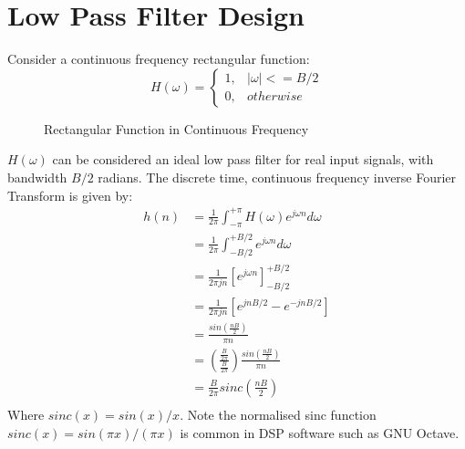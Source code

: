 \documentclass{article}
\begin{document}
\section {Low Pass Filter Design}

Consider a continuous frequency rectangular function:
\begin{equation} \label{eq:h_omega}
H(\omega)= 
	\begin{cases}
      1, & |\omega| <= B/2 \\
      0, & otherwise
	\end{cases}
\end{equation}

\begin{figure}[h]
\caption{Rectangular Function in Continuous Frequency}
\vspace{5mm}
\label{fig:rect_freq}
\centering
{}
\end{figure}

$H(\omega)$ can be considered an ideal low pass filter for real input signals, with bandwidth $B/2$ radians. The discrete time, continuous frequency inverse Fourier Transform is given by:
\begin{equation} \label{eq:dtcf_1}
\begin{split}
h(n) &= \frac{1}{2 \pi} \int_{-\pi}^{+\pi} H(\omega )e^{j \omega n} d\omega \\
     &= \frac{1}{2 \pi} \int_{-B/2}^{+B/2} e^{j \omega n} d\omega \\
     &= \frac{1}{2 \pi jn} \left[ e^{j \omega n} \right]_{-B/2}^{+B/2} \\
     &= \frac{1}{2 \pi jn} \left[ e^{j n B/2} - e^{-j n B/2} \right] \\
     &= \frac{sin \left( \frac{nB}{2} \right) }{\pi n} \\
     &= \left( \frac{\frac{B}{2 \pi}}{\frac{B}{2 \pi}} \right ) \frac{sin \left( \frac{nB}{2} \right) }{\pi n} \\
     &= \frac{B}{2 \pi} sinc \left( \frac{nB}{2} \right) \\
\end{split}
\end{equation}
Where $sinc(x) = sin(x)/x$.  Note the normalised sinc function $sinc(x) = sin(\pi x)/(\pi x)$ is common in DSP software such as GNU Octave.
\end{document}
